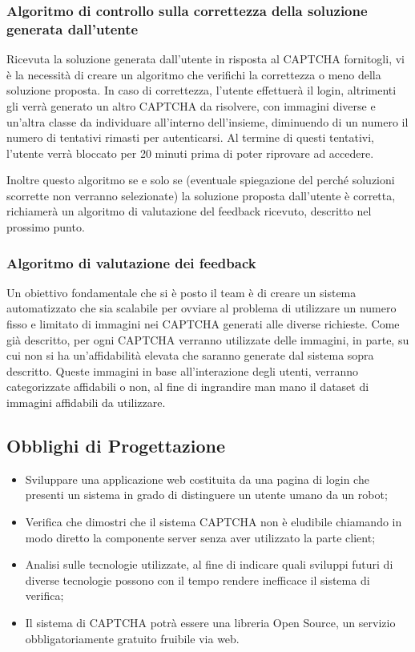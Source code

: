 \subsubsection{Algoritmo di controllo sulla correttezza della soluzione generata dall'utente}
Ricevuta la soluzione generata dall'utente in risposta al CAPTCHA fornitogli, vi è la necessità di creare un algoritmo che verifichi la correttezza o meno della soluzione proposta. In caso di correttezza, l'utente effettuerà il login, altrimenti gli verrà generato un altro CAPTCHA da risolvere, con immagini diverse e un'altra classe da individuare all'interno dell'insieme, diminuendo di un numero il numero di tentativi rimasti per autenticarsi. Al termine di questi tentativi, l'utente verrà bloccato per 20 minuti prima di poter riprovare ad accedere. 

Inoltre questo algoritmo se e solo se (eventuale spiegazione del perché soluzioni scorrette non verranno selezionate) la soluzione proposta dall'utente è corretta, richiamerà un algoritmo di valutazione del feedback ricevuto, descritto nel prossimo punto.

\subsubsection{Algoritmo di valutazione dei feedback}
Un obiettivo fondamentale che si è posto il team è di creare un sistema automatizzato che sia scalabile per ovviare al problema di utilizzare un numero fisso e limitato di immagini nei CAPTCHA generati alle diverse richieste. Come già descritto, per ogni CAPTCHA verranno utilizzate delle immagini, in parte, su cui non si ha un'affidabilità elevata che saranno generate dal sistema sopra descritto. Queste immagini in base all'interazione degli utenti, verranno categorizzate affidabili o non, al fine di ingrandire man mano il dataset di immagini affidabili da utilizzare.

\subsection{Obblighi di Progettazione}
\begin{itemize}:
    \item Sviluppare una applicazione web costituita da una pagina di login che presenti un sistema in grado di distinguere un utente umano da un robot;
    \item Verifica che dimostri che il sistema CAPTCHA non è eludibile chiamando in modo diretto la componente server senza aver utilizzato la parte client;
    \item Analisi sulle tecnologie utilizzate, al fine di indicare quali sviluppi futuri di diverse tecnologie possono con il tempo rendere inefficace il sistema di verifica;
    \item Il sistema di CAPTCHA potrà essere una libreria Open Source, un servizio obbligatoriamente gratuito fruibile via web.
\end{itemize}

